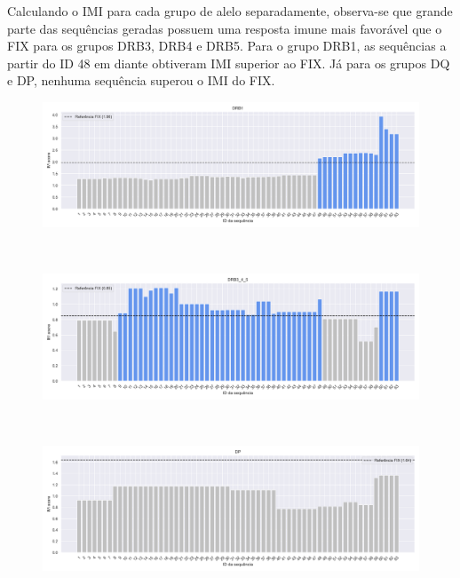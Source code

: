 Calculando o IMI para cada grupo de alelo separadamente, observa-se que grande parte das sequências geradas possuem uma resposta 
imune mais favorável que o FIX para os grupos DRB3, DRB4 e DRB5. 
Para o grupo DRB1, as sequências a partir do ID 48 em diante obtiveram IMI superior ao FIX. 
Já para os grupos DQ e DP, nenhuma sequência superou o IMI do FIX. 

\begin{figure}[H]
    \centering
    \begin{minipage}{0.9\textwidth}
        \centering
        \includegraphics[width=\textwidth]{figuras/plot_imuno_IMscore_DRB1.png}
    \end{minipage} \\[1ex]%
    \begin{minipage}{0.9\textwidth}
        \centering
        \includegraphics[width=\textwidth]{figuras/plot_imuno_IMscore_DRB3_4_5.png}
    \end{minipage} \\[1ex] %
    \begin{minipage}{0.9\textwidth}
        \centering
        \includegraphics[width=\textwidth]{figuras/plot_imuno_IMscore_DP.png}

\end{minipage}
\end{figure}

